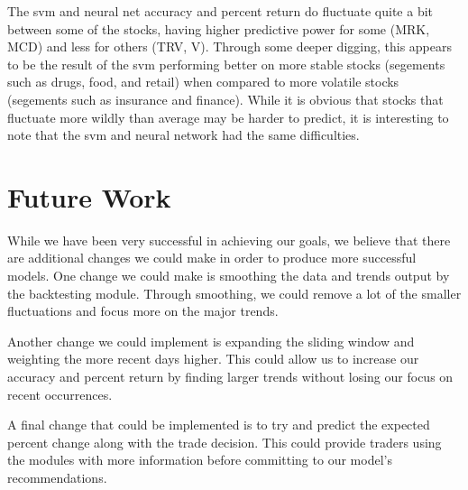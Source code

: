 \documentclass{article}
\begin{document}
The svm and neural net accuracy and percent return do fluctuate quite a bit between some of the stocks, having higher predictive power for some (MRK, MCD) and less for others (TRV, V). Through some deeper digging, this appears to be the result of the svm performing better on more stable stocks (segements such as drugs, food, and retail) when compared to more volatile stocks (segements such as insurance and finance). While it is obvious that stocks that fluctuate more wildly than average may be harder to predict, it is interesting to note that the svm and neural network had the same difficulties.

\section{Future Work}
While we have been very successful in achieving our goals, we believe that there are additional changes we could make in order to produce more successful models. One change we could make is smoothing the data and trends output by the backtesting module. Through smoothing, we could remove a lot of the smaller fluctuations and focus more on the major trends.

Another change we could implement is expanding the sliding window and weighting the more recent days higher. This could allow us to increase our accuracy and percent return by finding larger trends without losing our focus on recent occurrences.

A final change that could be implemented is to try and predict the expected percent change along with the trade decision. This could provide traders using the modules with more information before committing to our model's recommendations.
\end{document}
